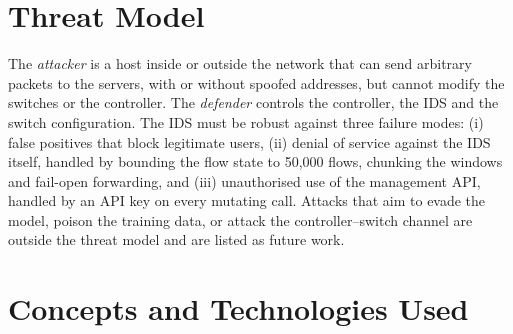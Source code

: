 \section{Threat Model}
The \emph{attacker} is a host inside or outside the network that can send arbitrary packets to the servers, with or without spoofed addresses, but cannot modify the switches or the controller. The \emph{defender} controls the controller, the IDS and the switch configuration. The IDS must be robust against three failure modes: (i) false positives that block legitimate users, (ii) denial of service against the IDS itself, handled by bounding the flow state to 50,000 flows, chunking the windows and fail-open forwarding, and (iii) unauthorised use of the management API, handled by an API key on every mutating call. Attacks that aim to evade the model, poison the training data, or attack the controller--switch channel are outside the threat model and are listed as future work.

\section{Concepts and Technologies Used}


